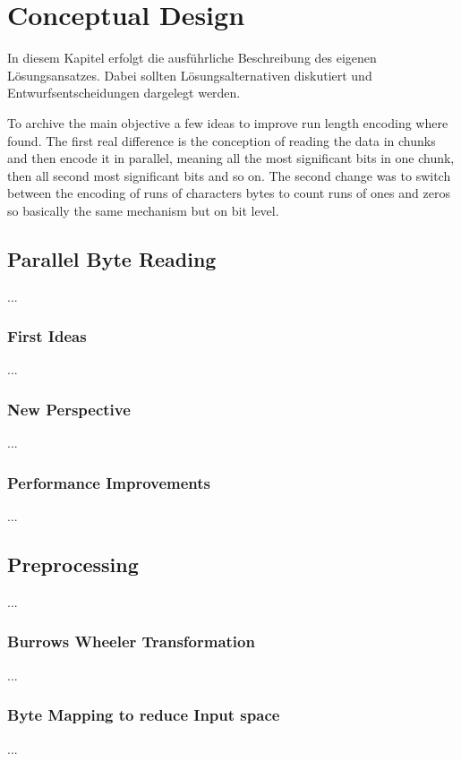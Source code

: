 
\chapter{Conceptual Design}
\label{ch:Conceptual Design}
In diesem Kapitel erfolgt die ausführliche Beschreibung des eigenen
Lösungsansatzes. Dabei sollten Lösungsalternativen diskutiert und
Entwurfsentscheidungen dargelegt werden.

To archive the main objective a few ideas to improve run length encoding where found. The first real difference is the conception of reading the data in chunks and then encode it in parallel, meaning all the most significant bits in one chunk, then all second most significant bits and so on. The second change was to switch between the encoding of runs of characters \/ bytes to count runs of ones and zeros so basically the same mechanism but on bit level.

\section{Parallel Byte Reading}
\label{ch:Conceptual Design:sec:Parallel Byte Reading}
...
\subsection{First Ideas}
...
\subsection{New Perspective}
...
\subsection{Performance Improvements}
...
\section{Preprocessing}
\label{ch:Conceptual Design:sec:Preprocessing}
...

\subsection{Burrows Wheeler Transformation}
...
\subsection{Byte Mapping to reduce Input space}
...

